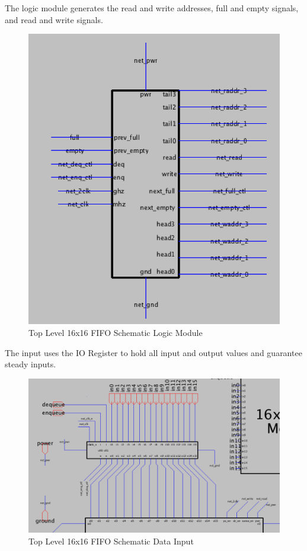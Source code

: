 \documentclass[a4paper]{article}
\begin{document}
The logic module generates the read and write addresses, full and empty signals, and read and write signals.

\begin{figure}[H]
	\centering
	\includegraphics[scale=0.65]{topLevelSchematicLogic}
	\caption{Top Level 16x16 FIFO Schematic Logic Module}
	\label{fig:topLevelSchematicLogic}
\end{figure}

The input uses the IO Register to hold all input and output values and guarantee steady inputs.

\begin{figure}[H]
	\centering
	\includegraphics[scale=0.4]{topLevelSchematicTop}
	\caption{Top Level 16x16 FIFO Schematic Data Input}
	\label{fig:topLevelSchematicTop}
\end{figure}
\end{document}
